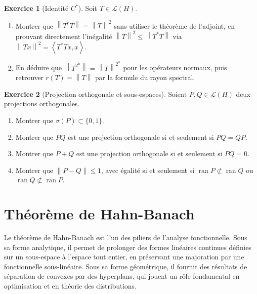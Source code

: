 \documentclass[a4paper,12pt]{book}
\DeclareMathOperator{\ran}{ran}
\newcommand{\norm}[1]{\left\| #1 \right\|}
\newcommand{\inner}[2]{\left\langle #1, #2 \right\rangle}
\theoremstyle{definition}
\newtheorem{exercice}{Exercice}[chapter]
\theoremstyle{plain}
\theoremstyle{remark}
\begin{document}
\begin{exercice}[Identité $C^*$]\label{exo:identite-cstar}
Soit $T \in \mathcal{L}(H)$.
\begin{enumerate}[label=(\alph*)]
    \item Montrer que $\norm{T^*T} = \norm{T}^2$ sans utiliser le théorème de
          l'adjoint, en prouvant directement l'inégalité
          $\norm{T}^2 \leq \norm{T^*T}$ via $\norm{Tx}^2 = \inner{T^*Tx}{x}$.
    \item En déduire que $\norm{T^{2^n}} = \norm{T}^{2^n}$ pour les opérateurs normaux,
          puis retrouver $r(T) = \norm{T}$ par la formule du rayon spectral.
\end{enumerate}
\end{exercice}

\begin{exercice}[Projection orthogonale et sous-espaces]\label{exo:projection-ortho}
Soient $P, Q \in \mathcal{L}(H)$ deux projections orthogonales.
\begin{enumerate}[label=(\alph*)]
    \item Montrer que $\sigma(P) \subset \{0, 1\}$.
    \item Montrer que $PQ$ est une projection orthogonale si et seulement si $PQ = QP$.
    \item Montrer que $P + Q$ est une projection orthogonale si et seulement si
          $PQ = 0$.
    \item Montrer que $\norm{P - Q} \leq 1$, avec égalité si et seulement si
          $\ran P \not\subset \ran Q$ ou $\ran Q \not\subset \ran P$.
\end{enumerate}
\end{exercice}



\chapter{Théorème de Hahn-Banach}
\label{chap:hahn-banach}
\minitoc

\vspace{1em}

Le théorème de Hahn-Banach est l'un des piliers de
l'analyse fonctionnelle. Sous sa forme analytique, il permet de prolonger des formes
linéaires continues définies sur un sous-espace à l'espace tout entier, en préservant
une majoration par une fonctionnelle sous-linéaire. Sous sa forme géométrique, il
fournit des résultats de séparation de convexes par des
hyperplans, qui jouent un rôle fondamental en optimisation et en théorie
des distributions.
\end{document}
